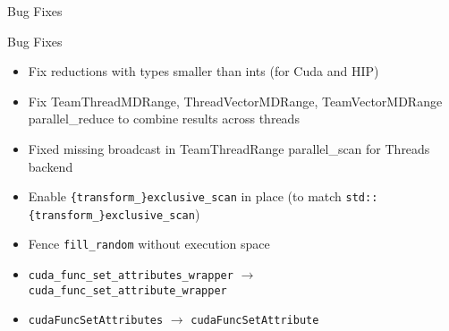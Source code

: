 

\begin{frame}[fragile]

  {\Huge Bug Fixes}
  
    \vspace{10pt}

\end{frame}



\begin{frame}[fragile]{Bug Fixes}
\begin{itemize}
\item Fix reductions with types smaller than ints (for Cuda and HIP)
\item Fix TeamThreadMDRange, ThreadVectorMDRange, TeamVectorMDRange parallel\_reduce to combine results across threads 
\item Fixed missing broadcast in TeamThreadRange parallel\_scan for Threads backend
\item Enable \texttt{\{transform\_\}exclusive\_scan} in place (to match \texttt{std::\{transform\_\}exclusive\_scan})
\item Fence \texttt{fill\_random} without execution space
\item \texttt{cuda\_func\_set\_attributes\_wrapper} $\rightarrow$ \texttt{cuda\_func\_set\_attribute\_wrapper}
\item \texttt{cudaFuncSetAttributes} $\rightarrow$ \texttt{cudaFuncSetAttribute}
\end{itemize}

\end{frame}


